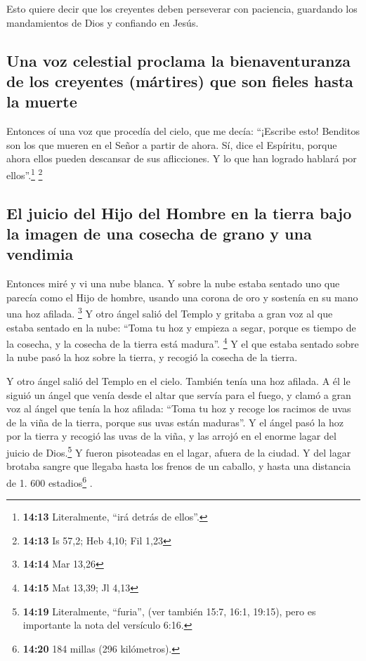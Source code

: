  Esto quiere decir que los creyentes deben perseverar con
paciencia, guardando los mandamientos de Dios y confiando en Jesús.

\hypertarget{una-voz-celestial-proclama-la-bienaventuranza-de-los-creyentes-muxe1rtires-que-son-fieles-hasta-la-muerte}{%
\subsection{Una voz celestial proclama la bienaventuranza de los
creyentes (mártires) que son fieles hasta la
muerte}\label{una-voz-celestial-proclama-la-bienaventuranza-de-los-creyentes-muxe1rtires-que-son-fieles-hasta-la-muerte}}

 Entonces oí una voz que procedía del cielo, que me
decía: ``¡Escribe esto! Benditos son los que mueren en el Señor a partir
de ahora. Sí, dice el Espíritu, porque ahora ellos pueden descansar de
sus aflicciones. Y lo que han logrado hablará por ellos''.\footnote{\textbf{14:13}
  Literalmente, ``irá detrás de ellos''.} \footnote{\textbf{14:13} Is
  57,2; Heb 4,10; Fil 1,23}

\hypertarget{el-juicio-del-hijo-del-hombre-en-la-tierra-bajo-la-imagen-de-una-cosecha-de-grano-y-una-vendimia}{%
\subsection{El juicio del Hijo del Hombre en la tierra bajo la imagen de
una cosecha de grano y una
vendimia}\label{el-juicio-del-hijo-del-hombre-en-la-tierra-bajo-la-imagen-de-una-cosecha-de-grano-y-una-vendimia}}

 Entonces miré y vi una nube blanca. Y sobre la nube
estaba sentado uno que parecía como el Hijo de hombre, usando una corona
de oro y sostenía en su mano una hoz afilada. \footnote{\textbf{14:14}
  Mar 13,26}  Y otro ángel salió del Templo y gritaba a
gran voz al que estaba sentado en la nube: ``Toma tu hoz y empieza a
segar, porque es tiempo de la cosecha, y la cosecha de la tierra está
madura''. \footnote{\textbf{14:15} Mat 13,39; Jl 4,13}  Y
el que estaba sentado sobre la nube pasó la hoz sobre la tierra, y
recogió la cosecha de la tierra.

 Y otro ángel salió del Templo en el cielo. También tenía
una hoz afilada.  A él le siguió un ángel que venía desde
el altar que servía para el fuego, y clamó a gran voz al ángel que tenía
la hoz afilada: ``Toma tu hoz y recoge los racimos de uvas de la viña de
la tierra, porque sus uvas están maduras''.  Y el ángel
pasó la hoz por la tierra y recogió las uvas de la viña, y las arrojó en
el enorme lagar del juicio de Dios.\footnote{\textbf{14:19}
  Literalmente, ``furia'', (ver también 15:7, 16:1, 19:15), pero es
  importante la nota del versículo 6:16.}  Y fueron
pisoteadas en el lagar, afuera de la ciudad. Y del lagar brotaba sangre
que llegaba hasta los frenos de un caballo, y hasta una distancia de 1.
600 estadios\footnote{\textbf{14:20} 184 millas (296 kilómetros).} .

